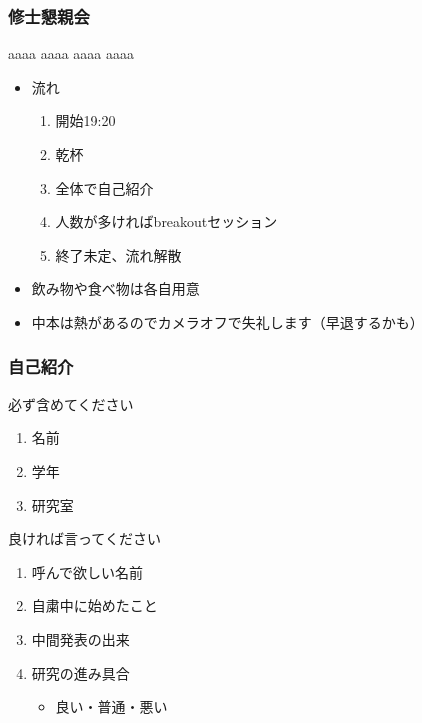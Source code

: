 \documentclass[dvipdfmx, handout]{beamer}
\begin{document}
\begin{frame}{}
  \frametitle{修士懇親会}
      aaaa
      aaaa
      aaaa
      aaaa
  \begin{itemize}
    \item 流れ
      \begin{enumerate}
          \pause
        \item 開始19:20
          \pause
        \item 乾杯
          \pause
        \item 全体で自己紹介
          \pause
        \item 人数が多ければbreakoutセッション
          \pause
        \item 終了未定、流れ解散
      \end{enumerate}
    \item 飲み物や食べ物は各自用意
    \item 中本は熱があるのでカメラオフで失礼します（早退するかも）
  \end{itemize}
\end{frame}

\begin{frame}{}
  \frametitle{自己紹介}
  \begin{multicols}{2}
    必ず含めてください
    \begin{enumerate}
      \item 名前
      \item 学年
      \item 研究室
    \end{enumerate}
    \columnbreak
    良ければ言ってください
    \begin{enumerate}
      \item 呼んで欲しい名前
      \item 自粛中に始めたこと
      \item 中間発表の出来
      \item 研究の進み具合
        \begin{itemize}
          \item 良い・普通・悪い
        \end{itemize}
    \end{enumerate}
  \end{multicols}
\end{frame}
\end{document}

